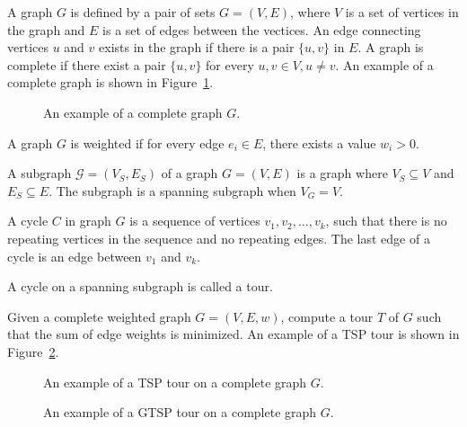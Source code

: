 \documentclass[../main.tex]{subfiles}
\begin{document}
A graph $G$ is defined by a pair of sets $G=(V,E)$, where $V$ is a set of vertices in the graph and $E$ is a set of edges between the vectices. An edge connecting vertices $u$ and $v$ exists in the graph if there is a pair $\{u,v\}$ in $E$. A graph is complete if there exist a pair $\{u,v\}$ for every $u,v\in V, u\neq v$. An example of a complete graph is shown in Figure~\ref{fig:complete_graph}.
\begin{figure}
	\centering
	
	\caption{An example of a complete graph $G$.}
	\label{fig:complete_graph}
\end{figure}

\begin{definition}
	A graph $G$ is weighted if for every edge $e_i\in E$, there exists a value $w_i>0$.
\end{definition}
\begin{definition}[Subgraph]
	A subgraph $\mathcal{G}=(V_S,E_S)$ of a graph $G=(V,E)$ is a graph where $V_S\subseteq V$ and $E_S\subseteq E$. The subgraph is a spanning subgraph when $V_G=V$.
\end{definition}
\begin{definition}[Cycle]
	A cycle $C$ in graph $G$ is a sequence of vertices $v_1,v_2,\ldots,v_k$, such that there is no repeating vertices in the sequence and no repeating edges. The last edge of a cycle is an edge between $v_1$ and $v_k$. 
\end{definition}
\begin{definition}[Tour]
	A cycle on a spanning subgraph is called a tour.
\end{definition}

\begin{problem}[TSP]
Given a complete weighted graph $G=(V,E,w)$, compute a tour $T$ of $G$ such that the sum of edge weights is minimized. An example of a TSP tour is shown in Figure~\ref{fig:tsp_tour}.
\end{problem}

\begin{figure}
	\centering
	
	\caption{An example of a TSP tour on a complete graph $G$.}
	\label{fig:tsp_tour}
\end{figure}

\begin{figure}
	\centering
	
	\caption{An example of a GTSP tour on a complete graph $G$.}
	\label{fig:gtsp_tour}
\end{figure}
\end{document}
